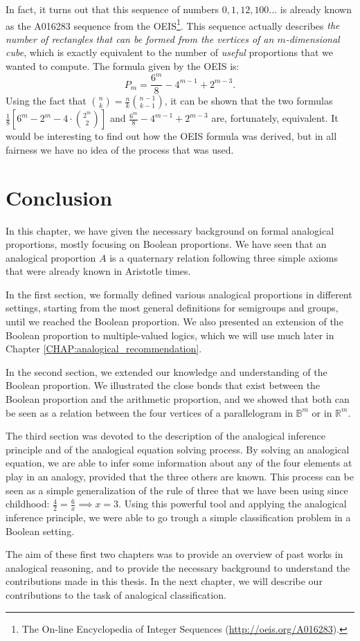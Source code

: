 In fact, it turns out that this sequence of numbers $0, 1, 12, 100\dots$ is
already known as the A016283 sequence from the OEIS\footnote{The On-line
Encyclopedia of Integer Sequences (\url{http://oeis.org/A016283}).}.
This sequence actually describes \textit{the number of rectangles that can be
formed from the vertices of an $m$-dimensional cube}, which is exactly
equivalent to the number of \textit{useful} proportions that we wanted to
compute. The formula given by the OEIS is:
$$P_m = \frac{6^m}{8} - 4^{m - 1} + 2^{m - 3}.$$
Using the fact that $\binom{n}{k} = \frac{n}{k}\binom{n - 1}{k - 1}$, it
can be shown that the two formulas $\frac{1}{8} \left[6^m - 2^m -
4\cdot\binom{2^m}{2} \right]$ and $\frac{6^m}{8} - 4^{m - 1} + 2^{m- 3}$ are,
fortunately, equivalent. It would be interesting to find out how the OEIS
formula was derived, but in all fairness we have no idea of the process that
was used.

\section*{Conclusion}

In this chapter, we have given the necessary background on formal analogical
proportions, mostly focusing on Boolean proportions. We have seen that an
analogical proportion $A$ is a quaternary relation following three simple
axioms that were already known in Aristotle times.

In the first section, we formally defined various analogical proportions in different settings,
starting from the most general definitions for semigroups and groups, until we
reached the Boolean proportion. We also presented an extension of the Boolean
proportion to multiple-valued logics, which we will use much later in Chapter
\ref{CHAP:analogical_recommendation}.

In the second section, we extended our knowledge and understanding of the Boolean
proportion. We illustrated the close bonds that exist between the Boolean
proportion and the arithmetic proportion, and we showed that both can be seen
as a relation between the four vertices of a parallelogram in $\mathbb{B}^m$ or
in $\mathbb{R}^m$.

The third section was devoted to the description of the analogical inference
principle and of the analogical equation solving process. By solving an
analogical equation, we are able to infer some information about any of the
four elements at play in an analogy, provided that the three others are known.
This process can be seen as a simple generalization of the rule of three that
we have been using since childhood: $\frac{4}{2} = \frac{6}{x} \implies x =
3$. Using this powerful tool and applying the analogical inference principle,
we were able to go trough a simple classification problem in a Boolean setting.

The aim of these first two chapters was to provide an overview of past works in
analogical reasoning, and to provide the necessary background to understand the
contributions made in this thesis. In the next chapter, we will describe our
contributions to the task of analogical classification.


